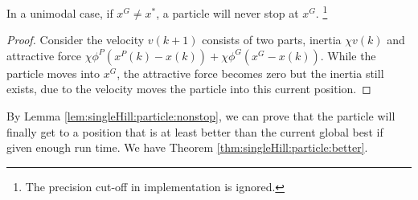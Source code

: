 \begin{mylem}
\label{lem:singleHill:particle:nonstop}
In a unimodal case, if $ x^{G} \not = x^{*} $, a particle will never stop at $ x^{G} $. 
\footnote{The precision cut-off in implementation is ignored.}
\begin{proof}
Consider the velocity $ v(k+1) $ consists of two parts, inertia $ \chi v(k) $ and attractive force $ \chi \phi^{P} (x^{P}(k) - x(k) ) + \chi \phi^{G} ( x^{G} - x(k) ) $.
While the particle moves into $ x^{G} $, the attractive force becomes zero but the inertia still exists, due to the velocity moves the particle into this current position.
\end{proof} 
\end{mylem}

By Lemma \ref{lem:singleHill:particle:nonstop}, we can prove that the particle will finally get to a position that is at least better than the current global best if given enough run time.
We have Theorem \ref{thm:singleHill:particle:better}.

